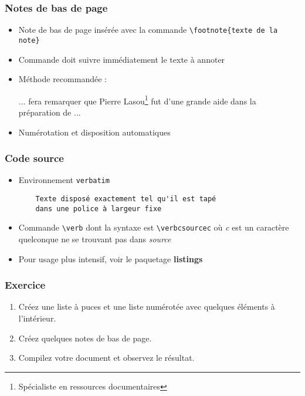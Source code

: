 
\begin{frame}[fragile]

	\frametitle{Notes de bas de page}
	
	\begin{itemize}
		\item Note de bas de page insérée avec la commande \lstinline|\footnote{texte de la note}|
			
		\item Commande doit suivre immédiatement le texte à annoter
		
		\item Méthode recommandée : 
		\begin{codesource}
	... fera remarquer que Pierre Lasou\footnote{%
	Spécialiste en ressources documentaires} %
	fut d'une grande aide dans la préparation de ...
		\end{codesource}
				
		\item Numérotation et disposition automatiques
	\end{itemize}
\end{frame}


\begin{frame}[fragile,c]

	\frametitle{Code source}
	
	\begin{itemize}
		\item Environnement \texttt{verbatim}
		\begin{codesource}
	\begin{verbatim}
	Texte disposé exactement tel qu'il est tapé
	dans une police à largeur fixe
	\end{verbatim}
		\end{codesource}
	
		\item Commande \texttt{\textbackslash verb} dont la syntaxe est \lstinline|\verbcsourcec| 
			où \textit{c} est un caractère quelconque ne se trouvant pas dans \textit{source}
			
		\item Pour usage plus intensif, voir le paquetage \textbf{listings}
	\end{itemize}
\end{frame}


\begin{frame}[c]

	\frametitle{Exercice \thenoExercice}
	
	\begin{enumerate}
		\item Créez une liste à puces et une liste numérotée avec quelques éléments à l'intérieur.
		\item Créez quelques notes de bas de page.
		\item Compilez votre document et observez le résultat.
	\end{enumerate}
\end{frame}

